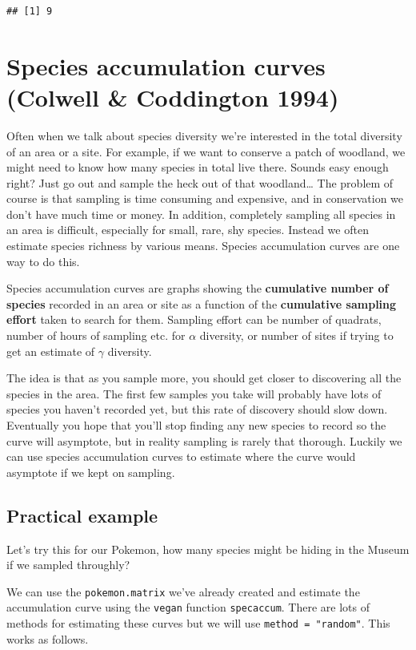 \documentclass[]{book}
\begin{document}
\begin{verbatim}
## [1] 9
\end{verbatim}

\section{Species accumulation curves (Colwell \& Coddington
1994)}\label{species-accumulation-curves-colwell-coddington-1994}

Often when we talk about species diversity we're interested in the total
diversity of an area or a site. For example, if we want to conserve a
patch of woodland, we might need to know how many species in total live
there. Sounds easy enough right? Just go out and sample the heck out of
that woodland\ldots{} The problem of course is that sampling is time
consuming and expensive, and in conservation we don't have much time or
money. In addition, completely sampling all species in an area is
difficult, especially for small, rare, shy species. Instead we often
estimate species richness by various means. Species accumulation curves
are one way to do this.

Species accumulation curves are graphs showing the \textbf{cumulative
number of species} recorded in an area or site as a function of the
\textbf{cumulative sampling effort} taken to search for them. Sampling
effort can be number of quadrats, number of hours of sampling etc. for
\(\alpha\) diversity, or number of sites if trying to get an estimate of
\(\gamma\) diversity.

The idea is that as you sample more, you should get closer to
discovering all the species in the area. The first few samples you take
will probably have lots of species you haven't recorded yet, but this
rate of discovery should slow down. Eventually you hope that you'll stop
finding any new species to record so the curve will asymptote, but in
reality sampling is rarely that thorough. Luckily we can use species
accumulation curves to estimate where the curve would asymptote if we
kept on sampling.

\subsection{Practical example}\label{practical-example}

Let's try this for our Pokemon, how many species might be hiding in the
Museum if we sampled throughly?

We can use the \texttt{pokemon.matrix} we've already created and
estimate the accumulation curve using the \texttt{vegan} function
\texttt{specaccum}. There are lots of methods for estimating these
curves but we will use \texttt{method\ =\ "random"}. This works as
follows.
\end{document}
